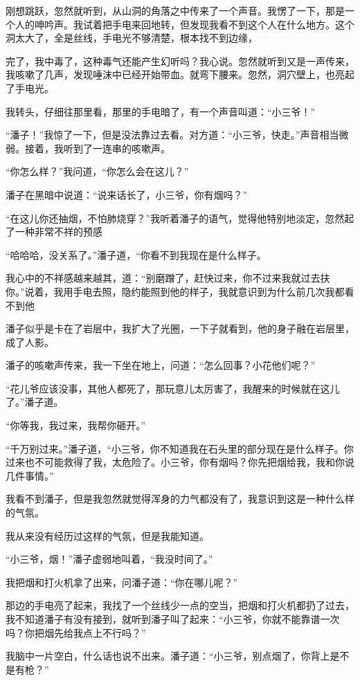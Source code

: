 刚想跳跃，忽然就听到，从山洞的角落之中传来了一个声音。我愣了一下，那是一个人的呻吟声。我试着把手电来回地转，但发现我看不到这个人在什么地方。这个洞太大了，全是丝线，手电光不够清楚，根本找不到边缘，

完了，我中毒了，这种毒气还能产生幻听吗？我心说。忽然就听到又是一声传来，我咳嗽了几声，发现唾沫中已经开始带血。就弯下腰来。忽然，洞穴壁上，也亮起了手电光。

我转头，仔细往那里看，那里的手电暗了，有一个声音叫道：“小三爷！”

“潘子！”我惊了一下，但是没法靠过去看。对方道：“小三爷，快走。”声音相当微弱。接着，我听到了一连串的咳嗽声。

“你怎么样？”我问道，“你怎么会在这儿？”

潘子在黑暗中说道：“说来话长了，小三爷，你有烟吗？”

“在这儿你还抽烟，不怕肺烧穿？”我听着潘子的语气，觉得他特别地淡定，忽然起了一种非常不祥的预感

“哈哈哈，没关系了。”潘子道，“你看不到我现在是什么样子。

我心中的不祥感越来越其，道：“别磨蹭了，赶快过来，你不过来我就过去扶你。”说着，我用手电去照，隐约能照到他的样子，我就意识到为什么前几次我都看不到他

潘子似乎是卡在了岩层中，我扩大了光圈，一下子就看到，他的身子融在岩层里，成了人影。

潘子的咳嗽声传来，我一下坐在地上，问道：“怎么回事？小花他们呢？”

“花儿爷应该没事，其他人都死了，那玩意儿太厉害了，我醒来的时候就在这儿了。”潘子道。

“你等我，我过来，我帮你砸开。”

“千万别过来。”潘子道，“小三爷，你不知道我在石头里的部分现在是什么样子。你过来也不可能救得了我，太危险了。小三爷，你有烟吗？你先把烟给我，我和你说几件事情。”

我看不到潘子，但是我忽然就觉得浑身的力气都没有了，我意识到这是一种什么样的气氛。

我从来没有经历过这样的气氛，但是我能知道。

“小三爷，烟！”潘子虚弱地叫着，“我没时间了。”

我把烟和打火机拿了出来，问潘子道：“你在哪儿呢？”

那边的手电亮了起来，我找了一个丝线少一点的空当，把烟和打火机都扔了过去，我不知道潘子有没有接到，就听到潘子叫了起来：“小三爷，你就不能靠谱一次吗？你把烟先给我点上不行吗？”

我脑中一片空白，什么话也说不出来。潘子道：“小三爷，别点烟了，你背上是不是有枪？”

